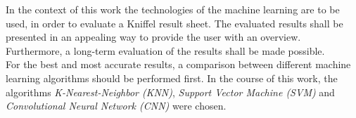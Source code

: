 In the context of this work the technologies of the machine learning are to be used, in order to evaluate a Kniffel result sheet. The evaluated results shall be presented in an appealing way to provide the user with an overview. Furthermore, a long-term evaluation of the results shall be made possible.\\\hfill
For the best and most accurate results, a comparison between different machine learning algorithms should be performed first. In the course of this work, the algorithms \textit{K-Nearest-Neighbor (KNN)}, \textit{Support Vector Machine (SVM)} and \textit{Convolutional Neural Network (CNN)} were chosen.
